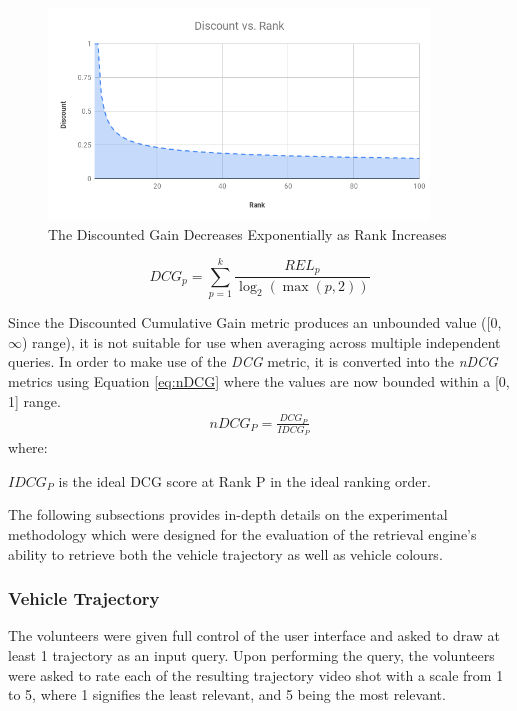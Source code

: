 \begin{figure}[!ht]
\centering
\includegraphics[width=0.9\textwidth]{image/retrievalTwo/discountvsrank.png}
\caption{The Discounted Gain Decreases Exponentially as Rank Increases}
\label{fig:dcgGain}       %
\end{figure}

\begin{equation}
\label{eq:DCGk}
DCG_p = \sum_{p=1}^k\frac{REL_{p}}{\log_2 (\max (p,2))}
\end{equation}


Since the Discounted Cumulative Gain metric produces an unbounded value ([0, $\infty$) range), it is not suitable for use when averaging across multiple independent queries. In order to make use of the \textit{DCG} metric, it is converted into the \textit{nDCG} metrics using Equation \ref{eq:nDCG} where the values are now bounded within a [0, 1] range.
\begin{align}
\label{eq:nDCG}
\textit{nDCG}_P = \frac{DCG_P}{IDCG_P}
\end{align}
where:

\hspace{2em} $IDCG_P$ is the ideal DCG score at Rank P in the ideal ranking order.

The following subsections provides in-depth details on the experimental methodology which were designed for the evaluation of the retrieval engine's ability to retrieve both the vehicle trajectory as well as vehicle colours.


\subsubsection{Vehicle Trajectory}
 The volunteers were given full control of the user interface and asked to draw at least 1 trajectory as an input query. Upon performing the query, the volunteers were asked to rate each of the resulting trajectory video shot with a scale from 1 to 5, where 1 signifies the least relevant, and 5 being the most relevant.

